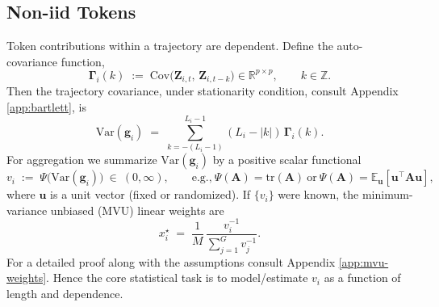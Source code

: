 \subsection{Non-iid Tokens}\label{subsec:token_dependence}
Token contributions within a trajectory are dependent. Define the auto-covariance function,
\begin{equation}
  \boldsymbol{\Gamma}_i(k)
  \;:=\;
  \mathrm{Cov}\!\big(\boldsymbol{Z}_{i,t},\,\boldsymbol{Z}_{i,t-k}\big)\in\mathbb{R}^{p\times p},
  \qquad k\in\mathbb{Z}.
  \label{eq:Gamma_def}
\end{equation}
Then the trajectory covariance, under stationarity condition, consult Appendix \ref{app:bartlett}, is
\begin{equation}
  \mathrm{Var}(\boldsymbol{g}_i)
  \;=\;
  \sum_{k=-(L_i-1)}^{L_i-1} (L_i-|k|)\,\boldsymbol{\Gamma}_i(k).
  \label{eq:var-sum}
\end{equation}
For aggregation we summarize $\mathrm{Var}(\boldsymbol{g}_i)$ by a positive scalar functional
\begin{equation}
  v_i \;:=\; \Psi\!\big(\mathrm{Var}(\boldsymbol{g}_i)\big)\ \in\ (0,\infty),
  \qquad
  \text{e.g.,}\ \Psi(\boldsymbol{A})=\mathrm{tr}(\boldsymbol{A})\ \text{or}\ \Psi(\boldsymbol{A})=\mathbb{E}_{\boldsymbol{u}}[\boldsymbol{u}^\top \boldsymbol{A}\boldsymbol{u}],
  \label{eq:scalar-proxy}
\end{equation}
where $\boldsymbol{u}$ is a unit vector (fixed or randomized). If $\{v_i\}$ were known, the minimum-variance unbiased (MVU) linear weights are
\begin{equation}
  x_i^\star \;=\; \frac{1}{M}\,\frac{v_i^{-1}}{\sum_{j=1}^{G} v_j^{-1}}.
  \label{eq:mvu-weights}
\end{equation}
For a detailed proof along with the assumptions consult Appendix \ref{app:mvu-weights}. Hence the core statistical task is to model/estimate $v_i$ as a function of length and dependence.




